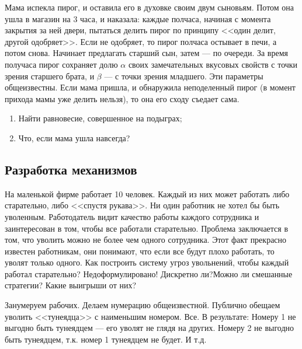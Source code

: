 \begin{problem}
\begin{source}
\cite{savva:nmu}
\end{source}
 Мама испекла пирог, и оставила его в духовке своим двум сыновьям. Потом она ушла в магазин на 3 часа, и наказала: каждые полчаса, начиная с момента закрытия за ней двери, пытаться делить пирог по принципу <<один делит, другой одобряет>>. Если не одобряет, то пирог полчаса остывает в печи, а потом снова. Начинает предлагать старший сын, затем --- по очереди. За время получаса пирог сохраняет долю $\alpha$ своих замечательных вкусовых свойств с точки зрения старшего брата, и $\beta$ --- с точки зрения младшего. Эти параметры общеизвестны. Если мама пришла, и обнаружила неподеленный пирог (в момент прихода мамы уже делить нельзя), то она его сходу съедает сама.
\begin{enumerate}
\item Найти равновесие, совершенное на подыграх;
\item Что, если мама ушла навсегда?
\end{enumerate}






\begin{sol}

\end{sol}
\end{problem}


\subsection{Разработка механизмов}

\begin{problem}\par
\begin{source} \cite{miller:gtw} \end{source}
На маленькой фирме работает 10 человек. Каждый из них может работать либо старательно, либо <<спустя рукава>>. Ни один работник не хотел бы быть уволенным. Работодатель видит качество работы каждого сотрудника и заинтересован в том, чтобы все работали старательно. Проблема заключается в том, что уволить можно не более чем одного сотрудника. Этот факт прекрасно известен работникам, они понимают, что если все будут плохо работать, то уволят только одного. Как построить систему угроз увольнений, чтобы каждый работал старательно?
{\red Недоформулировано! Дискретно ли?Можно ли смешанные стратегии? Какие выигрыши от них?}
\par




\begin{sol}
Занумеруем рабочих. Делаем нумерацию общеизвестной. Публично обещаем уволить <<тунеядца>> с наименьшим номером. Все. В результате: Номеру 1 не выгодно быть тунеядцем --- его уволят не глядя на других. Номеру 2 не выгодно быть тунеядцем, т.к. номер 1 тунеядцем не будет. И т.д.
\end{sol}
\end{problem}



